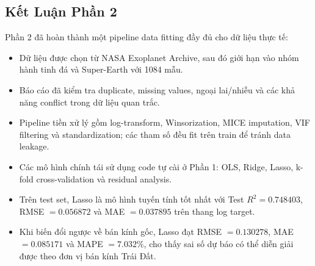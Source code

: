 ﻿\subsection{Kết Luận Phần 2}


Phần 2 đã hoàn thành một pipeline data fitting đầy đủ cho dữ liệu thực tế:
\begin{itemize}
    \item Dữ liệu được chọn từ NASA Exoplanet Archive, sau đó giới hạn vào nhóm hành tinh đá và
          Super-Earth với 1084 mẫu.
    \item Báo cáo đã kiểm tra duplicate, missing values, ngoại lai/nhiễu và các khả năng conflict
          trong dữ liệu quan trắc.
    \item Pipeline tiền xử lý gồm log-transform, Winsorization, MICE imputation, VIF filtering và
          standardization; các tham số đều fit trên train để tránh data leakage.
    \item Các mô hình chính tái sử dụng code tự cài ở Phần 1: OLS, Ridge, Lasso, k-fold
          cross-validation và residual analysis.
    \item Trên test set, Lasso là mô hình tuyến tính tốt nhất với Test $R^2=0.748403$,
          RMSE $=0.056872$ và MAE $=0.037895$ trên thang log target.
    \item Khi biến đổi ngược về bán kính gốc, Lasso đạt RMSE $=0.130278$, MAE $=0.085171$ và
          MAPE $=7.032\%$, cho thấy sai số dự báo có thể diễn giải được theo đơn vị bán kính
          Trái Đất.
\end{itemize}

